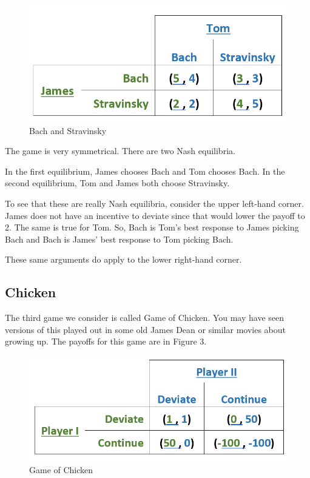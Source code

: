\documentclass[
]{book}
\begin{document}
\begin{figure}

{\centering \includegraphics[width=0.5\linewidth]{img/ch7/fig2} 

}

\caption{Bach and Stravinsky}\label{fig:fig702}
\end{figure}

The game is very symmetrical. There are two Nash equilibria.

In the first equilibrium, James chooses Bach and Tom chooses Bach. In the second equilibrium, Tom and James both choose Stravinsky.

To see that these are really Nash equilibria, consider the upper left-hand corner. James does not have an incentive to deviate since that would lower the payoff to 2. The same is true for Tom. So, Bach is Tom's best response to James picking Bach and Bach is James' best response to Tom picking Bach.

These same arguments do apply to the lower right-hand corner.

\hypertarget{chicken}{%
\subsection{Chicken}\label{chicken}}

The third game we consider is called Game of Chicken. You may have seen versions of this played out in some old James Dean or similar movies about growing up. The payoffs for this game are in Figure 3.

\begin{figure}

{\centering \includegraphics[width=0.5\linewidth]{img/ch7/fig3} 

}

\caption{Game of Chicken}\label{fig:fig703}
\end{figure}
\end{document}
